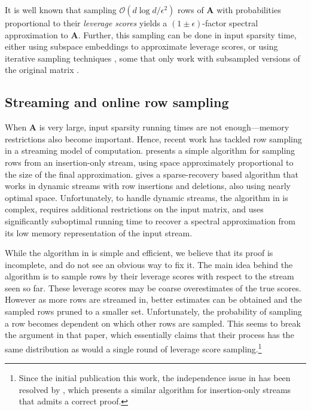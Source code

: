 \documentclass{toc}
\newcommand{\Oh}{\ensuremath{\mathcal{O}}}
\newcommand{\bv}[1]{\mathbf{#1}}
\begin{document}
It is well known that sampling $\Oh(d\log d/\epsilon^2)$ rows of $\bv{A}$ with probabilities proportional to their \emph{leverage scores} yields a $(1\pm \epsilon)$-factor spectral approximation to $\bv{A}$. Further, this sampling can be done in input sparsity time, either using subspace embeddings   to approximate leverage scores, or using iterative sampling techniques \cite{li2013iterative}, some that only work with subsampled versions of the original matrix \cite{cohen2015uniform}.

\subsection{Streaming and online row sampling}

When $\bv{A}$ is very large, input sparsity running times are not enough---memory restrictions also become important. Hence, recent work has tackled row sampling in a streaming model of computation. \cite{kelner2013spectral} presents a simple algorithm for sampling rows from an insertion-only stream, using space approximately proportional to the size of the final approximation. \cite{kapralov2014single} gives a sparse-recovery based algorithm that works in dynamic streams with row insertions and deletions, also using nearly optimal space. Unfortunately, to handle dynamic streams, the algorithm in \cite{kapralov2014single} is complex, requires additional restrictions on the input matrix, and uses significantly suboptimal running time to recover a spectral approximation from its low memory representation of the input stream.

While the algorithm in \cite{kelner2013spectral} is simple and efficient, we believe that its proof is incomplete, and do not see an obvious way to fix it. The main idea behind the algorithm is to sample rows by their leverage scores with respect to the stream seen so far. These leverage scores may be coarse overestimates of the true scores. However as more rows are streamed in, better estimates can be obtained and the sampled rows pruned to a smaller set.  Unfortunately, the probability of sampling a row becomes dependent on which other rows are sampled.  This seems to break the argument in that paper, which essentially claims that their process has the same distribution as would a single round of leverage score sampling.\footnote{Since the initial publication this work, the independence issue in \cite{kelner2013spectral} has been resolved by \cite{kyng2017framework}, which presents a similar algorithm for insertion-only streams that admits a correct proof.}
\end{document}
